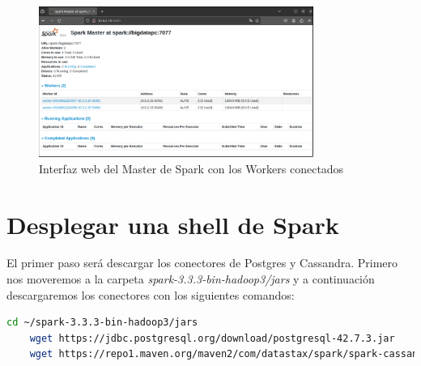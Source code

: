 \begin{figure}[H]
    \centering
    \includegraphics[width=0.8\textwidth]{figures/21.png}
    \caption{Interfaz web del Master de Spark con los Workers conectados}
\end{figure}

\section{Desplegar una shell de Spark}

El primer paso será descargar los conectores de Postgres y Cassandra. Primero nos moveremos a la carpeta \textit{spark-3.3.3-bin-hadoop3/jars} y a continuación descargaremos los conectores con los siguientes comandos:

\begin{lstlisting}[language=bash]
    cd ~/spark-3.3.3-bin-hadoop3/jars
    wget https://jdbc.postgresql.org/download/postgresql-42.7.3.jar
    wget https://repo1.maven.org/maven2/com/datastax/spark/spark-cassandra-connector_2.12/3.3.0/spark-cassandra-connector_2.12-3.3.0.jar
\end{lstlisting}



